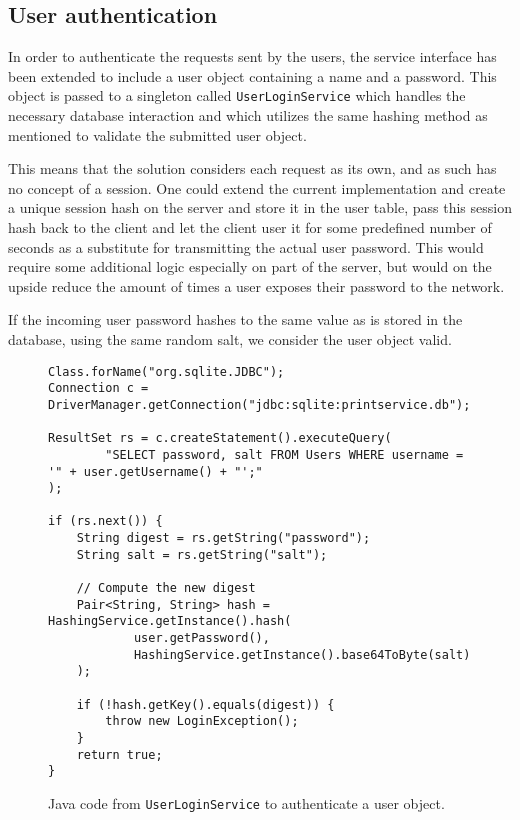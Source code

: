 \documentclass[12pt]{article}
\begin{document}
\subsection{User authentication}
\label{sub:User authentication}

In order to authenticate the requests sent by the users, the service interface has been extended to include a user object containing a name and a password. This object is passed to a singleton called \texttt{UserLoginService} which handles the necessary database interaction and which utilizes the same hashing method as mentioned to validate the submitted user object.

This means that the solution considers each request as its own, and as such has no concept of a session. One could extend the current implementation and create a unique session hash on the server and store it in the user table, pass this session hash back to the client and let the client user it for some predefined number of seconds as a substitute for transmitting the actual user password. This would require some additional logic especially on part of the server, but would on the upside reduce the amount of times a user exposes their password to the network.

If the incoming user password hashes to the same value as is stored in the database, using the same random salt, we consider the user object valid.

\begin{figure}[h!]
    \begin{lstlisting}
Class.forName("org.sqlite.JDBC");
Connection c = DriverManager.getConnection("jdbc:sqlite:printservice.db");

ResultSet rs = c.createStatement().executeQuery(
        "SELECT password, salt FROM Users WHERE username = '" + user.getUsername() + "';"
);

if (rs.next()) {
    String digest = rs.getString("password");
    String salt = rs.getString("salt");

    // Compute the new digest
    Pair<String, String> hash = HashingService.getInstance().hash(
            user.getPassword(),
            HashingService.getInstance().base64ToByte(salt)
    );

    if (!hash.getKey().equals(digest)) {
        throw new LoginException();
    }
    return true;
}
    \end{lstlisting}
    \caption{Java code from \texttt{UserLoginService} to authenticate a user object.}
\end{figure}
\end{document}
